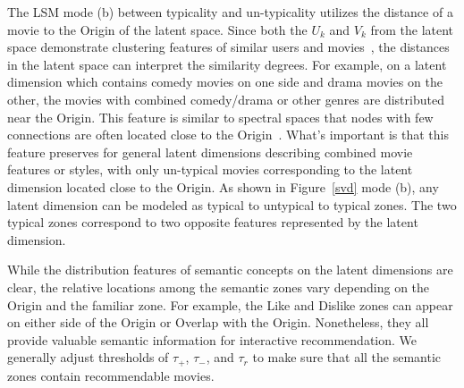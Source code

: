 \documentclass{vgtc}                          %
\begin{document}
The LSM mode (b) between typicality and un-typicality utilizes the distance of a movie to the Origin of the latent space.
Since both the $U_k$ and $V_k$ from the latent space demonstrate clustering features of similar users and movies~\cite{Pu:2013:UIR:2507157.2507178}, the distances in the latent space can interpret the similarity degrees.
For example, on a latent dimension which contains comedy movies on one side and drama movies on the other, the movies with combined comedy/drama or other genres are distributed near the Origin.
This feature is similar to spectral spaces that nodes with few connections are often located close to the Origin~\cite{6231611}.
What's important is that this feature preserves for general latent dimensions describing combined movie features or styles, with only un-typical movies corresponding to the latent dimension located close to the Origin.
As shown in Figure~\ref{svd} mode (b), any latent dimension can be modeled as typical to untypical to typical zones.
The two typical zones correspond to two opposite features represented by the latent dimension.

While the distribution features of semantic concepts on the latent dimensions are clear, the relative locations among the semantic zones 
vary depending on the Origin and the familiar zone.
For example, the Like and Dislike zones can appear on either side of the Origin or Overlap with the Origin.
Nonetheless, they all provide valuable semantic information for interactive recommendation.
We generally adjust thresholds of $\tau_{+}$, $\tau_{-}$, and $\tau_{r}$ to make sure that all the semantic zones contain recommendable movies.
\end{document}
